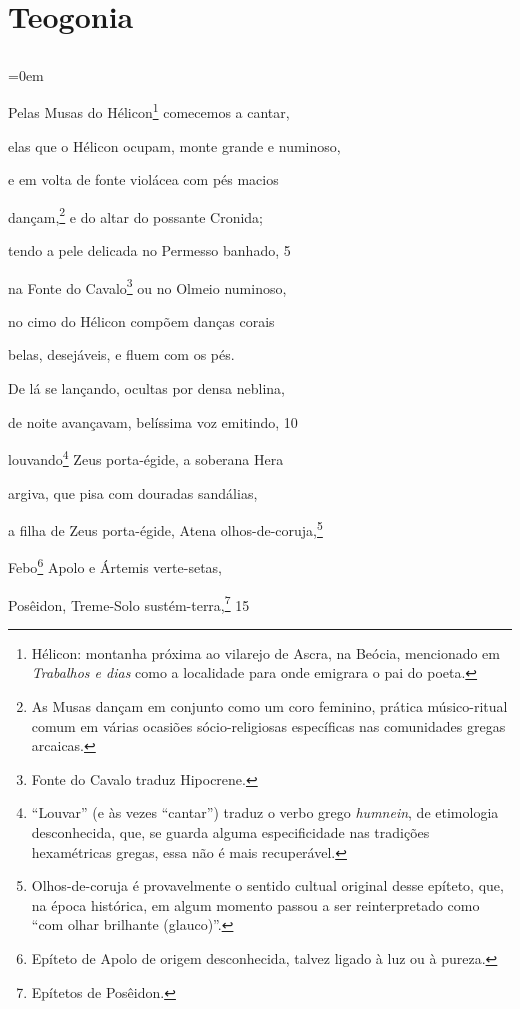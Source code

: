 \part{Teogonia}

\chapter*{}

\begingroup\parindent=0em

Pelas Musas do Hélicon\footnote{Hélicon: montanha próxima ao vilarejo de Ascra, na Beócia, mencionado
em \emph{Trabalhos e dias} como a localidade para onde emigrara o pai do
poeta.} comecemos a cantar,

elas que o Hélicon ocupam, monte grande e numinoso,

e em volta de fonte violácea com pés macios

dançam,\footnote{As Musas dançam em conjunto como um coro feminino, prática
músico-ritual comum em várias ocasiões sócio-religiosas específicas nas
comunidades gregas arcaicas.} e do altar do possante Cronida;

tendo a pele delicada no Permesso banhado, \num{5}

na Fonte do Cavalo\footnote{Fonte do Cavalo traduz Hipocrene.} ou no Olmeio numinoso,

no cimo do Hélicon compõem danças corais

belas, desejáveis, e fluem com os pés.

\quad{}De lá se lançando, ocultas por densa neblina,

de noite avançavam, belíssima voz emitindo, \num{10}

louvando\footnote{``Louvar'' (e às vezes ``cantar'') traduz o verbo grego
\emph{humnein}, de etimologia desconhecida, que, se guarda alguma
especificidade nas tradições hexamétricas gregas, essa não é mais
recuperável.} Zeus porta-égide, a soberana Hera

argiva, que pisa com douradas sandálias,

a filha de Zeus porta-égide, Atena olhos-de-coruja,\footnote{Olhos-de-coruja é provavelmente o sentido cultual original desse
epíteto, que, na época histórica, em algum momento passou a ser
reinterpretado como ``com olhar brilhante (glauco)''.}

Febo\footnote{Epíteto de Apolo de origem desconhecida, talvez ligado à luz
ou à pureza.} Apolo e Ártemis verte-setas,

Posêidon, Treme-Solo sustém-terra,\footnote{Epítetos de Posêidon.} \num{15}

